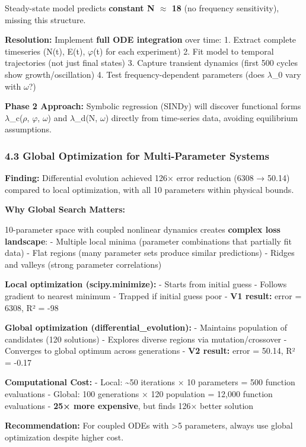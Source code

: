 \documentclass[
]{article}
\begin{document}
Steady-state model predicts \textbf{constant N $\approx$ 18} (no frequency
sensitivity), missing this structure.

\textbf{Resolution:} Implement \textbf{full ODE integration} over time:
1. Extract complete timeseries (N(t), E(t), $\varphi$(t) for each experiment) 2.
Fit model to temporal trajectories (not just final states) 3. Capture
transient dynamics (first 500 cycles show growth/oscillation) 4. Test
frequency-dependent parameters (does $\lambda$\_0 vary with $\omega$?)

\textbf{Phase 2 Approach:} Symbolic regression (SINDy) will discover
functional forms $\lambda$\_c($\rho$, $\varphi$, $\omega$) and $\lambda$\_d(N, $\omega$) directly from time-series
data, avoiding equilibrium assumptions.

\subsubsection{4.3 Global Optimization for Multi-Parameter
Systems}\label{global-optimization-for-multi-parameter-systems}

\textbf{Finding:} Differential evolution achieved 126× error reduction
(6308 → 50.14) compared to local optimization, with all 10 parameters
within physical bounds.

\textbf{Why Global Search Matters:}

10-parameter space with coupled nonlinear dynamics creates
\textbf{complex loss landscape}: - Multiple local minima (parameter
combinations that partially fit data) - Flat regions (many parameter
sets produce similar predictions) - Ridges and valleys (strong parameter
correlations)

\textbf{Local optimization (scipy.minimize):} - Starts from initial
guess - Follows gradient to nearest minimum - Trapped if initial guess
poor - \textbf{V1 result:} error = 6308, R² = -98

\textbf{Global optimization (differential\_evolution):} - Maintains
population of candidates (120 solutions) - Explores diverse regions via
mutation/crossover - Converges to global optimum across generations -
\textbf{V2 result:} error = 50.14, R² = -0.17

\textbf{Computational Cost:} - Local: \textasciitilde50 iterations × 10
parameters = 500 function evaluations - Global: 100 generations × 120
population = 12,000 function evaluations - \textbf{25× more expensive},
but finds 126× better solution

\textbf{Recommendation:} For coupled ODEs with \textgreater5 parameters,
always use global optimization despite higher cost.
\end{document}
